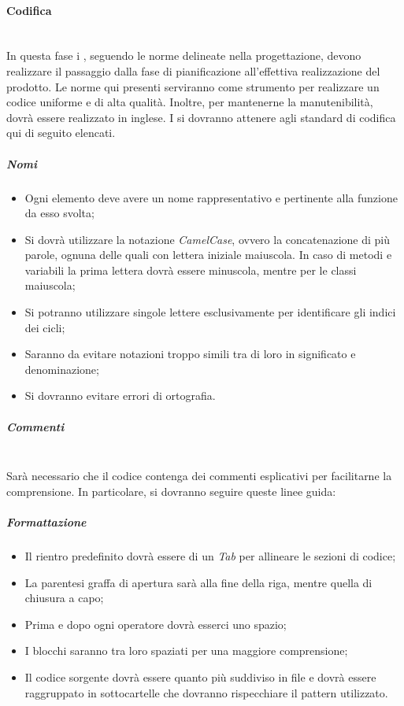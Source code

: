 	\paragraph{Codifica}
	~\\In questa fase i \progrs, seguendo le norme delineate nella progettazione, devono realizzare il passaggio dalla fase di pianificazione all'effettiva realizzazione del prodotto.
	Le norme qui presenti serviranno come strumento per realizzare un codice uniforme e di alta qualità. Inoltre, per mantenerne la manutenibilità, dovrà essere realizzato in inglese.
	I \progrs{} si dovranno attenere agli standard di codifica qui di seguito elencati.
	\subparagraph{Nomi}
	\begin{itemize}
		\item Ogni elemento deve avere un nome rappresentativo e pertinente alla funzione da esso svolta;
		\item Si dovrà utilizzare la notazione \emph{CamelCase}, ovvero la concatenazione di più parole, ognuna delle quali con lettera iniziale maiuscola. In caso di metodi e variabili la prima lettera dovrà essere minuscola, mentre per le classi maiuscola;
		\item Si potranno utilizzare singole lettere esclusivamente per identificare gli indici dei cicli;
		\item Saranno da evitare notazioni troppo simili tra di loro in significato e denominazione;
		\item Si dovranno evitare errori di ortografia.
	\end{itemize}
	\subparagraph{Commenti}
	~\\Sarà necessario che il codice contenga dei commenti esplicativi per facilitarne la comprensione.
	\newline In particolare, si dovranno seguire queste linee guida:
	
	\begin{comment}
	\begin{itemize}
		\item \textcolor{red}{lista di linee guida per i commenti}
	\end{itemize}
	\end{comment}
	
	\subparagraph{Formattazione}
	\begin{itemize} 
		\item Il rientro predefinito dovrà essere di un \emph{Tab} per allineare le sezioni di codice;
		\item La parentesi graffa di apertura sarà alla fine della riga, mentre quella di chiusura a capo;
		\item Prima e dopo ogni operatore dovrà esserci uno spazio;
		\item I blocchi saranno tra loro spaziati per una maggiore comprensione;
		\item Il codice sorgente dovrà essere quanto più suddiviso in file e dovrà essere raggruppato in sottocartelle che dovranno rispecchiare il pattern utilizzato.
	\end{itemize}
